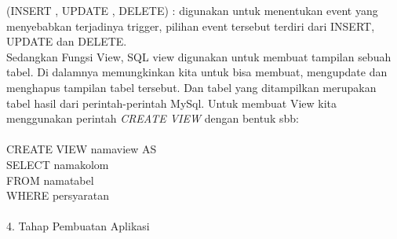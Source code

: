 \documentclass{article}
\begin{document}
(INSERT , UPDATE , DELETE) : digunakan untuk menentukan event yang menyebabkan terjadinya trigger, pilihan event tersebut terdiri dari INSERT, UPDATE dan DELETE.
\\
Sedangkan Fungsi View, SQL view digunakan untuk membuat tampilan sebuah tabel. Di dalamnya memungkinkan kita untuk bisa membuat, mengupdate dan menghapus tampilan tabel tersebut. Dan tabel yang ditampilkan merupakan tabel hasil dari perintah-perintah MySql.
Untuk membuat View kita menggunakan perintah \textit{CREATE VIEW} dengan bentuk sbb:\\
\\CREATE VIEW namaview AS\\
SELECT namakolom\\
FROM namatabel\\
WHERE persyaratan\\
\\
    4. Tahap Pembuatan Aplikasi\\
\end{document}
